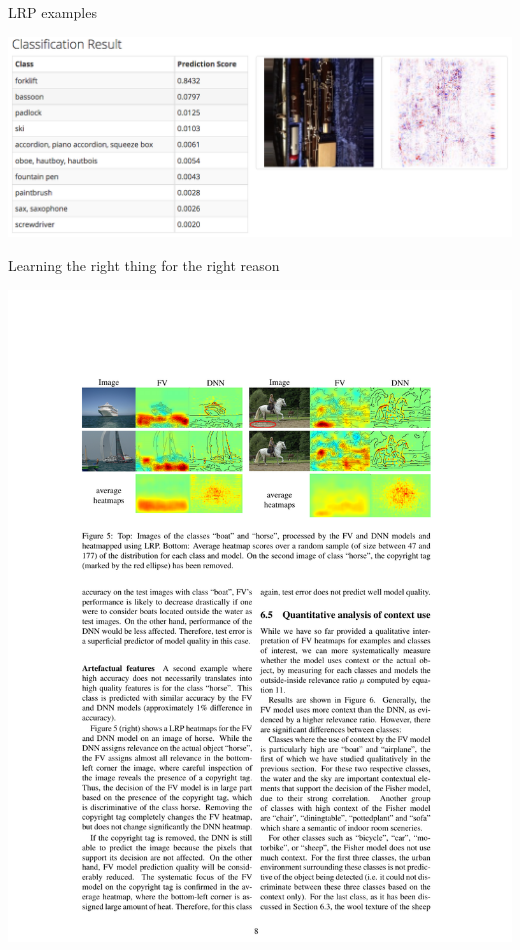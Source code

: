\documentclass[xetex,compress]{beamer}
\begin{document}
\begin{frame}{LRP examples}
  \begin{center}
    \includegraphics[width=1.00\textwidth]{./figures/lrp_example_3.png}
  \end{center}
\end{frame}

\begin{frame}{Learning the right thing for the right reason}
  \begin{center}
    \includegraphics[width=1.00\textwidth]{./figures/fv_vs_dnn.pdf}
  \end{center}
\end{frame}
\end{document}

